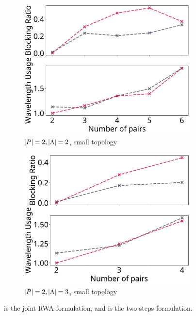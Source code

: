 \begin{figure}[!htbp]
\centering
\begin{subfigure}{0.49\textwidth}
\includegraphics[width=\textwidth]{pictures/plots/rawa/n_pairs/x-2-2-s.pdf}
	\caption{$\lvert P\rvert=2, \lvert\Lambda\rvert = 2$, small topology}
\end{subfigure}
\begin{subfigure}{0.49\textwidth}
\includegraphics[width=\textwidth]{pictures/plots/rawa/n_pairs/x-2-3-s.pdf}
	\caption{$\lvert P\rvert=2, \lvert\Lambda\rvert = 3$, small topology}
\end{subfigure}
\caption{%
\protect\reddashed is the joint RWA formulation, and 
\protect\blackdashed is the two-steps formulation.
}
\label{fig:rawa}
\end{figure}

